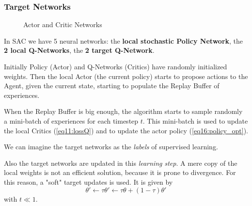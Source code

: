 \documentclass[a4paper, 11pt]{article}
\begin{document}
	\subsubsection{Target Networks} 
	\begin{figure}[!h]
		\begin{center}
		\end{center}		
		\caption{Actor and Critic Networks}
		\label{fig:actor_critic}
	\end{figure}
	In SAC we have 5 neural networks: the \textbf{local stochastic Policy Network}, the \textbf{2 local Q-Networks}, the \textbf{2 target Q-Network}.
	
	Initially Policy (Actor) and Q-Networks (Critics) have randomly initialized weights. Then the local Actor (the current policy) starts to propose actions to the Agent, given the current state, starting to populate the Replay Buffer of experiences.
	
	When the Replay Buffer is big enough, the algorithm starts to sample randomly a mini-batch of experiences for each timestep $t$. This mini-batch is used to update the local Critics (\vref{eq11:lossQ}) and to update the actor policy (\vref{eq16:policy_opt}).
	
	We can imagine the target networks as the \textit{labels} of supervised learning.
	
	Also the target networks are updated in this \textit{learning step}. A mere copy of the local weights is not an efficient solution, because it is prone to divergence. For this reason, a "soft" target updates is used. It is given by \[\theta' \leftarrow \tau\theta' \leftarrow \tau \theta + (1-\tau)\theta'\] with $t \ll 1$.
	
\end{document}
